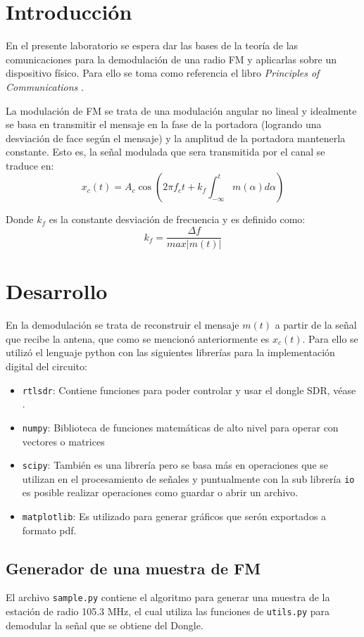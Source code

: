 \section{Introducción}
	En el presente laboratorio se espera dar las bases de la teoría de las comunicaciones para la demodulación de una radio FM y aplicarlas sobre un dispositivo físico.
Para ello se toma como referencia el libro \emph{Principles of Communications} \cite{PrinciplesofCommunications}.

La modulación de FM se trata de una modulación angular no lineal y idealmente se basa en transmitir el mensaje en la fase de la portadora (logrando una desviación de face según el mensaje) y la amplitud de la portadora mantenerla constante. Esto es, la señal modulada que sera transmitida por el canal se traduce en:
$$
	x_c (t) = A_c \cos \left( 2 \pi f_c t + k_f \int_{-\infty}^{t} m(\alpha) d\alpha \right)
$$

Donde $k_f$ es la constante desviación de frecuencia y es definido como:
$$
	k_f = \frac{\Delta f}{max|m(t)|}
$$


\section{Desarrollo}
En la demodulación se trata de reconstruir el mensaje $m(t)$ a partir de la señal que recibe la antena, que como se mencionó anteriormente es $x_c(t)$.
Para ello se utilizó el lenguaje python con las siguientes librerías para la implementación digital del circuito:
\begin{itemize}
	\item \texttt{rtlsdr}: Contiene funciones para poder controlar y usar el dongle SDR, véase \cite{pyrtlsdr}.
	\item \texttt{numpy}: Biblioteca de funciones matemáticas de alto nivel para operar con vectores o matrices
	\item \texttt{scipy}: También es una librería pero se basa más en operaciones que se utilizan en el procesamiento de señales y puntualmente con la sub librería \texttt{io} es posible realizar operaciones como guardar o abrir un archivo. 
	\item \texttt{matplotlib}: Es utilizado para generar gráficos que serón exportados a formato pdf. 
\end{itemize}

\subsection{Generador de una muestra de FM}
El archivo \texttt{sample.py} contiene el algoritmo para generar una muestra de la estación de radio 105.3 MHz, el cual utiliza las funciones de \texttt{utils.py} para demodular la señal que se obtiene del Dongle.

